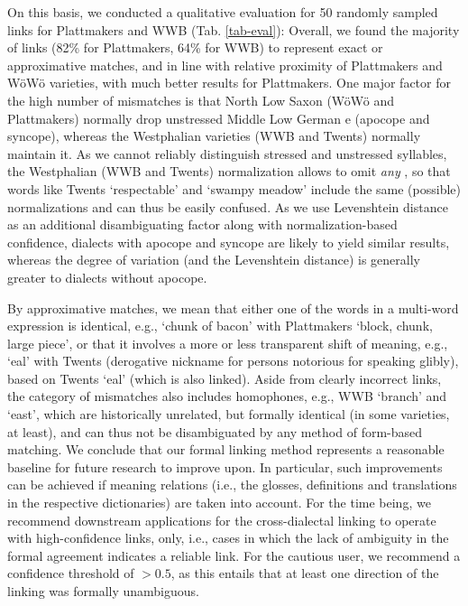 On this basis, we conducted a qualitative evaluation for 50 randomly sampled links for Plattmakers and WWB (Tab. \ref{tab-eval}): 
Overall, we found the majority of links (82\% for Plattmakers, 64\% for WWB) to represent exact or approximative matches, and in line with relative proximity of Plattmakers and WöWö varieties, with much better results for Plattmakers. One major factor for the high number of mismatches is that North Low Saxon (WöWö and Plattmakers) normally drop unstressed Middle Low German e (apocope and syncope), whereas the Westphalian varieties (WWB and Twents) normally maintain it. 
As we cannot reliably distinguish stressed and unstressed syllables, the Westphalian (WWB and Twents) normalization allows to omit \emph{any} , so that words like Twents  `respectable' and  `swampy meadow' include the same (possible) normalizations and can thus be easily confused. As we use Levenshtein distance as an additional disambiguating factor along with normalization-based confidence, dialects with apocope and syncope are likely to yield similar results, whereas the degree of variation (and the Levenshtein distance) is generally greater to dialects without apocope.

By approximative matches, we mean that either one of the words in a multi-word expression is identical, e.g.,  `chunk of bacon' with Plattmakers  `block, chunk, large piece', or that it involves a more or less transparent shift of meaning, e.g.,  `eal' with Twents  (derogative nickname for persons notorious for speaking glibly), based on Twents  `eal' (which is also linked). 
Aside from clearly incorrect links, the category of mismatches also includes homophones, e.g., WWB  `branch' and  `east', which are historically unrelated, but formally identical (in some varieties, at least), and can thus not be disambiguated by any method of form-based matching.  We conclude that our formal linking method represents a reasonable baseline for future research to improve upon.
In particular, such improvements can be achieved if meaning relations (i.e., the glosses, definitions and translations in the respective dictionaries) are taken into account. 
For the time being, we recommend downstream applications for the cross-dialectal linking to operate with high-confidence links, only, i.e., cases in which the lack of ambiguity in the formal agreement indicates a reliable link. For the cautious user, we recommend a confidence threshold of $>0.5$, as this entails that at least one direction of the linking was formally unambiguous. 

